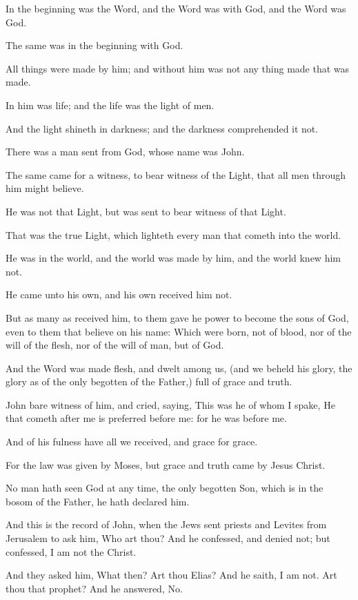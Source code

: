 \Chapter
\Verse In the beginning was the Word, and the Word was with God, and the Word was God.

\Verse The same was in the beginning with God.

\Verse All things were made by him; and without him was not any thing made that was made.

\Verse In him was life; and the life was the light of men.

\Verse And the light shineth in darkness; and the darkness comprehended it not.

\Verse There was a man sent from God, whose name was John.

\Verse The same came for a witness, to bear witness of the Light, that all men through him might believe.

\Verse He was not that Light, but was sent to bear witness of that Light.

\Verse That was the true Light, which lighteth every man that cometh into the world.

\Verse He was in the world, and the world was made by him, and the world knew him not.

\Verse He came unto his own, and his own received him not.

\Verse But as many as received him, to them gave he power to become the sons of God, even to them that believe on his name: \Verse Which were born, not of blood, nor of the will of the flesh, nor of the will of man, but of God.

\Verse And the Word was made flesh, and dwelt among us, (and we beheld his glory, the glory as of the only begotten of the Father,) full of grace and truth.

\Verse John bare witness of him, and cried, saying, This was he of whom I spake, He that cometh after me is preferred before me: for he was before me.

\Verse And of his fulness have all we received, and grace for grace.

\Verse For the law was given by Moses, but grace and truth came by Jesus Christ.

\Verse No man hath seen God at any time, the only begotten Son, which is in the bosom of the Father, he hath declared him.

\Verse And this is the record of John, when the Jews sent priests and Levites from Jerusalem to ask him, Who art thou?  \Verse And he confessed, and denied not; but confessed, I am not the Christ.

\Verse And they asked him, What then? Art thou Elias? And he saith, I am not. Art thou that prophet? And he answered, No.

